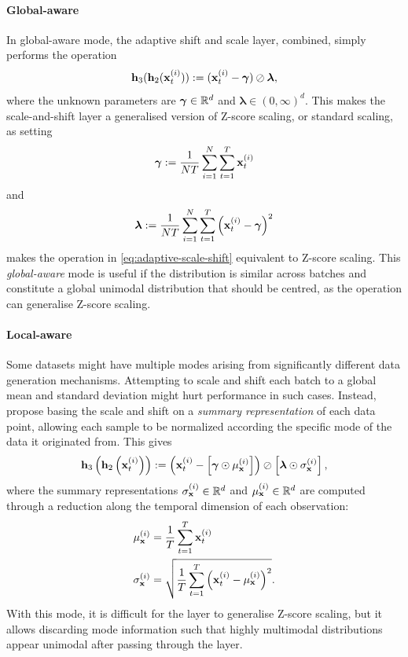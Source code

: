 \documentclass{statsmsc}
\begin{document}
{\paragraph{Global-aware}%
\label{par:Global-aware}

In global-aware mode, the adaptive shift and scale layer, combined, simply performs the operation
\begin{equation}\label{eq:adaptive-scale-shift}
    \mathbf{h}_3(\mathbf{h}_2(\mathbf{x}_t^{(i)})):=(\mathbf{x}_t^{(i)} - \bm\gamma) \oslash \bm\lambda,
\end{equation}
where the unknown parameters are $\bm\gamma \in \mathbb{R}^d$ and $\bm\lambda \in (0,\infty)^d$.
This makes the scale-and-shift layer a generalised version of
Z-score scaling, or standard scaling, as setting
\begin{equation}
    \bm\gamma:=\frac{1}{N T}  \sum^{N}_{i=1} \sum^{T}_{t=1} \mathbf{x}_{t}^{(i)}
\end{equation}
and
\begin{equation}
    \bm\lambda:=\frac{1}{N T} \sum^{N}_{i=1} \sum^{T}_{t=1} \left(\mathbf{x}_{t}^{(i)}- \bm\gamma\right)^2
\end{equation}
makes the operation in \cref{eq:adaptive-scale-shift} equivalent to Z-score scaling.
This \textit{global-aware} mode is useful if the distribution is similar across batches
and constitute a global unimodal distribution that should be centred, as the operation can generalise Z-score scaling.

\paragraph{Local-aware}%
\label{par:Local-aware}

Some datasets might have multiple modes arising from significantly different
data generation mechanisms. Attempting to scale and shift each batch to a global mean and
standard deviation might hurt performance in such cases. Instead, \citeauthor{dain} propose
basing the scale and shift on a \textit{summary representation} of each data point, allowing
each sample to be normalized according the specific mode  of the data it originated from.
This gives
\begin{equation}
    \mathbf{h}_3\left(\mathbf{h}_2\left(\mathbf{x}_t^{(i)}\right)\right):= 
    \left(\mathbf{x}_t^{(i)} - \left[\bm\gamma \odot \mu_{\mathbf{x}}^{(i)}\right]\right) \oslash \left[\bm\lambda \odot \sigma_{\mathbf{x}}^{(i)}\right],
\end{equation}
where the summary representations $\sigma_{\mathbf{x}}^{(i)} \in \mathbb{R}^d$ and $\mu_{\mathbf{x}}^{(i)} \in \mathbb{R}^d$ are computed through a reduction
along the temporal dimension of each observation:
\begin{align}
    \mu_{\mathbf{x}}^{(i)}&=\frac{1}{T} \sum^{T}_{t=1} \mathbf{x}^{(i)}_t  \\
    \sigma_{\mathbf{x}}^{(i)}&=\sqrt{\frac{1}{T}  \sum^{T}_{t=1} \left(\mathbf{x}^{(i)}_t- \mu_{\mathbf{x}}^{(i)} \right)^2}.
\end{align}
With this mode, it is difficult for the layer to generalise Z-score scaling, but it allows
discarding mode information such that highly multimodal distributions appear unimodal after passing
through the layer.

}
\end{document}
